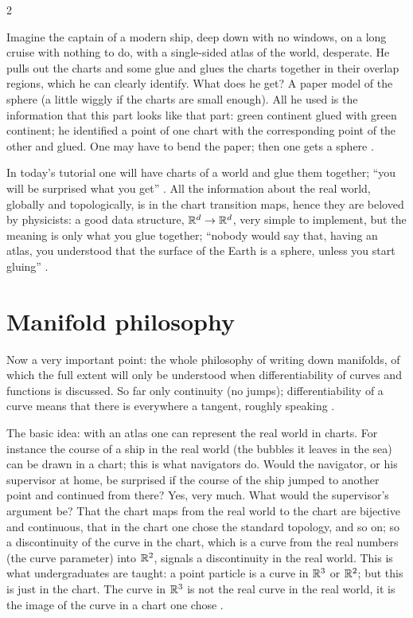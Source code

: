 \begin{paracol}{2}
\begin{example}\label{ex:c02-glue}
Imagine the captain of a modern ship, deep down with no windows, on a long cruise with nothing to do, with a single-sided atlas of the world, desperate. He pulls out the charts and some glue and glues the charts together in their overlap
regions, which he can clearly identify. What does he get? A paper model of the sphere (a little wiggly if the charts are small enough). All he used is the information that this part looks like that part: green continent glued with green continent; he identified a point of one chart with the
corresponding point of the other and glued. One may have to bend the paper; then one gets a sphere .
\end{example}
In today's tutorial one will have charts of a world and glue them together; ``you will be surprised what you get'' . All the information about the real world, globally and topologically, is in the chart transition maps, hence they are beloved by physicists: a good
data structure, $\mathbb{R}^d\to\mathbb{R}^d$, very simple to implement, but the meaning is only what you glue together; ``nobody would say that, having an atlas, you understood that the surface of the Earth is a sphere, unless you start gluing'' .

\section{Manifold philosophy}\label{sec:c02-philosophy}

Now a very important point: the whole philosophy of writing down manifolds, of which the full extent will only be understood when differentiability of curves and functions is discussed. So far only continuity (no jumps); differentiability of a curve means that there is
everywhere a tangent, roughly speaking .

The basic idea: with an atlas one can represent the real world in charts. For instance the course of a ship in the real world (the bubbles it leaves in the sea) can be drawn in a chart; this is what navigators do. Would the navigator, or his supervisor at home, be surprised if the course of the ship
jumped to another point and continued from there? Yes, very much. What would the supervisor's argument be? That the chart maps from the real world to the chart are bijective and continuous, that in the chart one chose the standard topology, and so on; so a discontinuity of the curve in the chart, which is a curve from the
real numbers (the curve parameter) into $\mathbb{R}^2$, signals a discontinuity in the real world. This is what undergraduates are taught: a point particle is a curve in $\mathbb{R}^3$ or $\mathbb{R}^2$; but this is just in the chart. The curve in $\mathbb{R}^3$ is not the real curve in the real world, it is the image of the curve in a chart one chose
.


\end{paracol}
